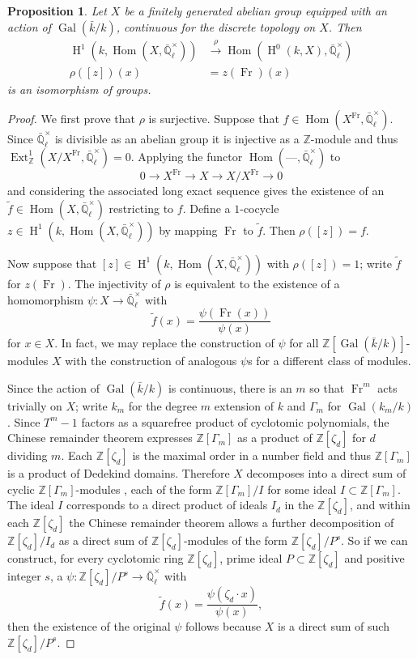 \documentclass[11pt]{amsart}
\theoremstyle{plain}
\newtheorem{proposition}[theorem]{Proposition}
\theoremstyle{definition}
\theoremstyle{remark}
\newcommand{\ZZ}{{\mathbb{Z}}}
\newcommand{\EE}{\mathbb{\bar Q}_\ell}
\newcommand{\bFq}{\bar{k}}
\newcommand{\Fq}{k}
\newcommand{\Fqm}{k_m}
\newcommand{\EEx}{\EE^\times}
\DeclareMathOperator{\Gal}{Gal}
\newcommand{\Frob}{{\operatorname{Fr}}}
\DeclareMathOperator{\Hom}{Hom}
\DeclareMathOperator{\Ext}{Ext}
\DeclareMathOperator{\Hh}{H}
\begin{document}
\begin{proposition}\label{prop:X}
  Let $X$ be a finitely generated abelian group equipped with an
  action of $\Gal(\bFq/\Fq)$, continuous for the discrete topology on
  $X$.  Then
  \begin{align*}
    \Hh^1(\Fq, \Hom(X, \EEx)) &\xrightarrow{\rho} \Hom(\Hh^0(\Fq, X), \EEx) \\
    \rho([z])(x) &= z(\Frob)(x)
  \end{align*}
  is an isomorphism of groups.
\end{proposition}
\begin{proof}
  We first prove that $\rho$ is surjective.  Suppose that
  $f \in \Hom(X^\Frob, \EEx).$ Since $\EEx$ is divisible
  as an abelian group it is injective as a $\ZZ$-module and thus
  $\Ext^1_{\ZZ}(X/X^\Frob, \EEx) = 0$.  Applying the functor
  $\Hom(\mbox{---}, \EEx)$ to
  $$0 \rightarrow X^\Frob \rightarrow X \rightarrow X/X^\Frob \rightarrow 0$$
  and considering the associated long exact sequence gives the
  existence of an $\tilde{f} \in \Hom(X, \EEx)$ restricting to
  $f$.  Define a $1$-cocycle $z \in \Hh^1(\Fq, \Hom(X,\EEx))$ by
  mapping $\Frob$ to $\tilde{f}$.  Then $\rho([z]) = f$.

  Now suppose that $[z] \in \Hh^1(\Fq,\Hom(X,\EEx))$ with
  $\rho([z]) = 1$; write $\tilde{f}$ for $z(\Frob)$.  The injectivity
  of $\rho$ is equivalent to the existence of a homomorphism $\psi
  \colon X \rightarrow \EEx$ with
  $$\tilde{f}(x) = \frac{\psi(\Frob(x))}{\psi(x)}$$
  for $x \in X$.  In fact, we may replace the construction of $\psi$
  for all $\ZZ[\Gal(\bFq/\Fq)]$-modules $X$ with the construction of
  analogous $\psi$s for a different class of modules.

  Since the action of $\Gal(\bFq/\Fq)$ is continuous, there is an $m$
  so that $\Frob^m$ acts trivially on $X$; write $\Fqm$ for the degree
  $m$ extension of $\Fq$ and $\Gamma_m$ for $\Gal(\Fqm/\Fq)$.  Since
  $T^m-1$ factors as a squarefree product of cyclotomic polynomials,
  the Chinese remainder theorem expresses $\ZZ[\Gamma_m]$ as a product
  of $\ZZ[\zeta_d]$ for $d$ dividing $m$.  Each $\ZZ[\zeta_d]$ is the
  maximal order in a number field and thus $\ZZ[\Gamma_m]$ is a
  product of Dedekind domains.  Therefore $X$ decomposes into a direct
  sum of cyclic $\ZZ[\Gamma_m]$-modules \cite[?]{Brandal}, each of the
  form $\ZZ[\Gamma_m] / I$ for some ideal $I \subset \ZZ[\Gamma_m]$.
  The ideal $I$ corresponds to a direct product of ideals $I_d$ in the
  $\ZZ[\zeta_d]$, and within each $\ZZ[\zeta_d]$ the Chinese remainder
  theorem allows a further decomposition of $\ZZ[\zeta_d] / I_d$ as a
  direct sum of $\ZZ[\zeta_d]$-modules of the form $\ZZ[\zeta_d]/P^s$.
  So if we can construct, for every cyclotomic ring $\ZZ[\zeta_d]$,
  prime ideal $P \subset \ZZ[\zeta_d]$ and positive integer $s$, a
  $\psi \colon \ZZ[\zeta_d]/P^s \rightarrow \EEx$ with
  \begin{equation} \label{eq:psi-condition}
    \tilde{f}(x) = \frac{\psi(\zeta_d \cdot x)}{\psi(x)},
  \end{equation}
  then the existence of the original $\psi$ follows because $X$ is a
  direct sum of such $\ZZ[\zeta_d]/P^s$.


\end{proof}
\end{document}
